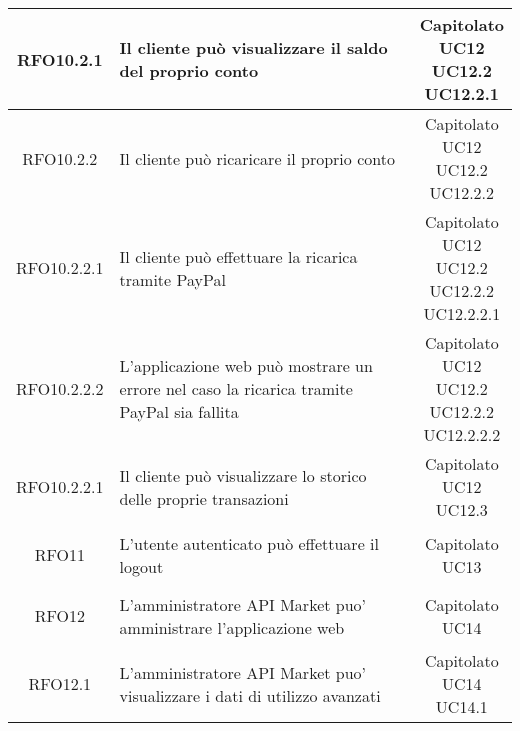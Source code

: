 \begin{longtable}{|c|p{8cm}|c|}
\hypertarget{RFO10.2.1}{RFO10.2.1} & Il cliente può visualizzare il saldo del proprio conto & \makecell*{Capitolato\\UC12\\UC12.2\\UC12.2.1} \\
\hline
\hypertarget{RFO10.2.2}{RFO10.2.2} & Il cliente può ricaricare il proprio conto & \makecell*{Capitolato\\UC12\\UC12.2\\UC12.2.2} \\
\hline

\hypertarget{RFO10.2.2.1}{RFO10.2.2.1} & Il cliente può effettuare la ricarica tramite PayPal & \makecell*{Capitolato\\UC12\\UC12.2\\UC12.2.2\\UC12.2.2.1} \\
\hline

\hypertarget{RFO10.2.2.2}{RFO10.2.2.2} & L'applicazione web può mostrare un errore nel caso la ricarica tramite PayPal sia fallita & \makecell*{Capitolato\\UC12\\UC12.2\\UC12.2.2\\UC12.2.2.2} \\
\hline

\hypertarget{RFO10.3}{RFO10.2.2.1} & Il cliente può visualizzare lo storico delle proprie transazioni & \makecell*{Capitolato\\UC12\\UC12.3} \\
\hline

\hypertarget{RFO11}{RFO11} & L'utente autenticato può effettuare il logout & \makecell*{Capitolato\\UC13} \\
\hline

\hypertarget{RFO12}{RFO12} &  L'amministratore API Market puo' amministrare l'applicazione web & \makecell*{Capitolato\\UC14} \\
\hline

\hypertarget{RFO12.1}{RFO12.1} &  L'amministratore API Market puo' visualizzare i dati di utilizzo avanzati & \makecell*{Capitolato\\UC14\\UC14.1} \\
\hline


\end{longtable}
